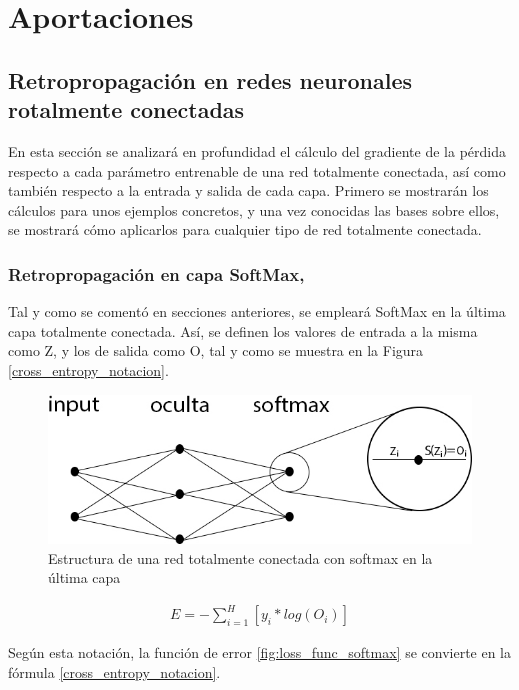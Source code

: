 \chapter{Aportaciones}

\section{Retropropagación en redes neuronales rotalmente conectadas}

En esta sección se analizará en profundidad el cálculo del gradiente de la pérdida respecto a cada parámetro entrenable de una red totalmente conectada, así como también respecto a la entrada y salida de cada capa. Primero se mostrarán los cálculos para unos ejemplos concretos, y una vez conocidas las bases sobre ellos, se mostrará cómo aplicarlos para cualquier tipo de red totalmente conectada. 

\subsection{Retropropagación en capa SoftMax, \cite{Cross_entropy_backprop} \cite{Cross_entropy_backprop_grad_input}} 

Tal y como se comentó en secciones anteriores, se empleará SoftMax en la última capa totalmente conectada. Así, se definen los valores de entrada a la misma como Z, y los de salida como O, tal y como se muestra en la Figura \ref{cross_entropy_notacion}.

\begin{figure}[H]
	\centering
	\includegraphics[scale=0.4]{imagenes/NN_softmax.jpg}  
	\caption{Estructura de una red totalmente conectada con softmax en la última capa}
\end{figure}

\begin{gather}
	E = - \sum_{i=1}^{H}  [y_i * log(O_i)] 
	\label{cross_entropy_notacion}
\end{gather}

Según esta notación, la función de error \ref{fig:loss_func_softmax} se convierte en la fórmula \ref{cross_entropy_notacion}.


